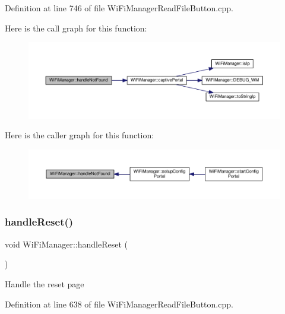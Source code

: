 Definition at line 746 of file Wi\+Fi\+Manager\+Read\+File\+Button.\+cpp.

Here is the call graph for this function\+:\nopagebreak
\begin{figure}[H]
\begin{center}
\leavevmode
\includegraphics[width=350pt]{class_wi_fi_manager_a7d01f7de3e4b76acdabffac79fa3d0ab_cgraph}
\end{center}
\end{figure}
Here is the caller graph for this function\+:\nopagebreak
\begin{figure}[H]
\begin{center}
\leavevmode
\includegraphics[width=350pt]{class_wi_fi_manager_a7d01f7de3e4b76acdabffac79fa3d0ab_icgraph}
\end{center}
\end{figure}
\mbox{\label{class_wi_fi_manager_a94fb1a8fcfbd0d02714c69138bf72f9c}} 
\subsubsection{\texorpdfstring{handle\+Reset()}{handleReset()}}
{\footnotesize\ttfamily void Wi\+Fi\+Manager\+::handle\+Reset (\begin{DoxyParamCaption}{ }\end{DoxyParamCaption})\hspace{0.3cm}{\ttfamily [private]}}

Handle the reset page 

Definition at line 638 of file Wi\+Fi\+Manager\+Read\+File\+Button.\+cpp.

